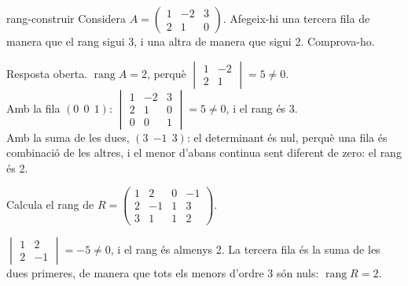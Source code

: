 \begin{apartats}
\begin{tria}{rang-construir}
Considera $A=\begin{pmatrix}1&-2&3\\2&1&0\end{pmatrix}$. Afegeix-hi una tercera fila de manera que el
rang sigui 3, i una altra de manera que sigui 2. Comprova-ho.

\begin{solucio}
Resposta oberta. $\operatorname{rang}A=2$, perquè $\begin{vmatrix}1&-2\\2&1\end{vmatrix}=5\ne0$.\\
Amb la fila $(0\ \ 0\ \ 1)$: $\begin{vmatrix}1&-2&3\\2&1&0\\0&0&1\end{vmatrix}=5\ne0$, i el rang és 3.\\
Amb la suma de les dues, $(3\ \ {-1}\ \ 3)$: el determinant és nul, perquè una fila és combinació de les
altres, i el menor d'abans continua sent diferent de zero: el rang és 2.
\end{solucio}
\end{tria}

\begin{nomesllarg}
Calcula el rang de $R=\begin{pmatrix}1&2&0&-1\\2&-1&1&3\\3&1&1&2\end{pmatrix}$.

\begin{solucio}
$\begin{vmatrix}1&2\\2&-1\end{vmatrix}=-5\ne0$, i el rang és almenys 2. La tercera fila és la suma de les
dues primeres, de manera que tots els menors d'ordre 3 són nuls: $\operatorname{rang}R=2$.
\end{solucio}
\end{nomesllarg}

\end{apartats}
